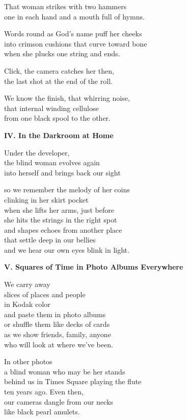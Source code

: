 \documentclass[twoside,10pt]{book}
\begin{document}
That woman strikes with two hammers\\
one in each hand and a mouth full of hymns.

Words round as God's name puff her cheeks\\
into crimson cushions that curve toward bone\\
when she plucks one string and ends.

Click, the camera catches her then,\\
the last shot at the end of the roll.

We know the finish, that whirring noise,\\
that internal winding cellulose\\
from one black spool to the other.

{\bf IV.  In the Darkroom at Home}

Under the developer,\\
the blind woman evolves again\\
into herself and brings back our sight

so we remember the melody of her coins\\
clinking in her skirt pocket\\
when she lifts her arms, just before\\
she hits the strings in the right spot\\
and shapes echoes from another place\\
that settle deep in our bellies\\
and we hear our own eyes blink in light.

{\bf V.  Squares of Time in Photo Albums Everywhere}

We carry away\\
slices of places and people\\
in Kodak color\\
and paste them in photo albums\\
or shuffle them like decks of cards\\
as we show friends, family, anyone\\
who will look at where we've been.

In other photos\\
a blind woman who may be her stands\\
behind us in Times Square playing the flute\\
ten years ago. Even then,\\
our cameras dangle from our necks\\
like black pearl amulets.
\end{document}
